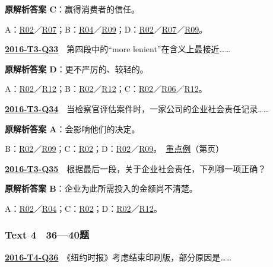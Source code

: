 \documentclass[11pt,a4paper]{article}
\begin{document}
\noindent\textbf{原解析答案 C}：赢得消费者的信任。\par\nopagebreak
\noindent A：\hyperref[cat-R02]{R02}／\hyperref[cat-R07]{R07}；B：\hyperref[cat-R04]{R04}／\hyperref[cat-R09]{R09}；D：\hyperref[cat-R02]{R02}／\hyperref[cat-R07]{R07}／\hyperref[cat-R09]{R09}。\par\smallskip
{}\label{idx-2016-T3-Q33}\noindent\textbf{\href{https://zj139.github.io/math-notes/english/b6f08ab4d489c8194307c00d/\#q33}{2016-T3-Q33}}　第四段中的“more lenient”在含义上最接近……\par\nopagebreak
\noindent\textbf{原解析答案 D}：更不严厉的、较轻的。\par\nopagebreak
\noindent A：\hyperref[cat-R02]{R02}／\hyperref[cat-R12]{R12}；B：\hyperref[cat-R02]{R02}／\hyperref[cat-R12]{R12}；C：\hyperref[cat-R02]{R02}／\hyperref[cat-R06]{R06}／\hyperref[cat-R12]{R12}。\par\smallskip
{}\label{idx-2016-T3-Q34}\noindent\textbf{\href{https://zj139.github.io/math-notes/english/b6f08ab4d489c8194307c00d/\#q34}{2016-T3-Q34}}　当检察官评估案件时，一家公司的企业社会责任记录……\par\nopagebreak
\noindent\textbf{原解析答案 A}：会影响他们的决定。\par\nopagebreak
\noindent B：\hyperref[cat-R02]{R02}／\hyperref[cat-R09]{R09}；C：\hyperref[cat-R02]{R02}；D：\hyperref[cat-R02]{R02}／\hyperref[cat-R09]{R09}。　\hyperref[case-2016-T3-Q34]{重点例}（第\pageref{case-2016-T3-Q34}页）\par\smallskip
{}\label{idx-2016-T3-Q35}\noindent\textbf{\href{https://zj139.github.io/math-notes/english/b6f08ab4d489c8194307c00d/\#q35}{2016-T3-Q35}}　根据最后一段，关于企业社会责任，下列哪一项正确？\par\nopagebreak
\noindent\textbf{原解析答案 B}：企业为此所需投入的金额尚不清楚。\par\nopagebreak
\noindent A：\hyperref[cat-R02]{R02}／\hyperref[cat-R04]{R04}；C：\hyperref[cat-R02]{R02}；D：\hyperref[cat-R02]{R02}／\hyperref[cat-R12]{R12}。\par\smallskip
{}\subsubsection{Text 4　36—40题}
\label{idx-2016-T4-Q36}\noindent\textbf{\href{https://zj139.github.io/math-notes/english/52a512b347cf9f366ac3f189/\#q36}{2016-T4-Q36}}　《纽约时报》考虑结束印刷版，部分原因是……\par\nopagebreak
\end{document}

